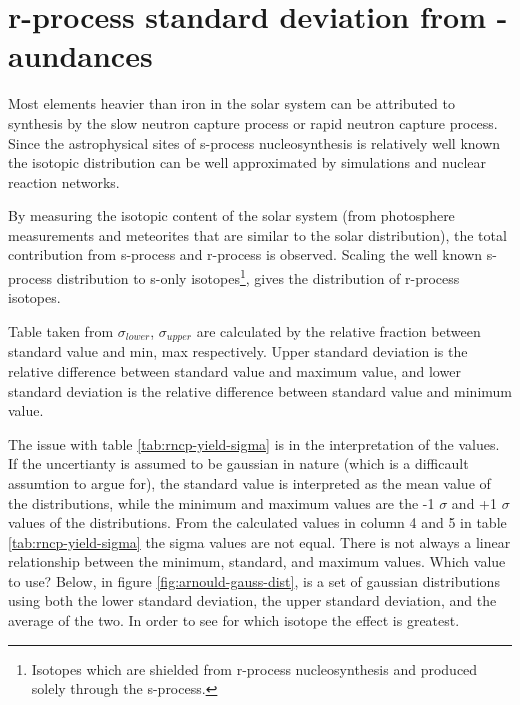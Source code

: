 \section{r-process standard deviation from \sos-aundances}
Most elements heavier than iron in the solar system can be attributed to synthesis by the slow neutron capture process or rapid neutron capture process. Since the astrophysical sites of s-process nucleosynthesis is relatively well known the isotopic distribution can be well approximated by simulations and nuclear reaction networks.

By measuring the isotopic content of the solar system (from photosphere measurements and meteorites that are similar to the solar distribution), the total contribution from s-process and r-process is observed. Scaling the well known s-process distribution to s-only isotopes\footnote{Isotopes which are shielded from r-process nucleosynthesis and produced solely through the s-process.}, gives the distribution of r-process isotopes.

\begin{table}
  
  \caption[Observed r-process abundances in \sos\ ()]{\label{tab:rncp-yield-sigma}
    Table taken from 
    $\sigma_{lower}$, $\sigma_{upper}$ are calculated by the relative fraction between standard value and min, max respectively.
    Upper standard deviation is the relative difference between standard value and maximum value, and lower standard deviation is the relative difference between standard value and minimum value.
  }
\end{table}
\FloatBarrier

The issue with table \ref{tab:rncp-yield-sigma} is in the interpretation of the values. If the uncertianty is assumed to be gaussian in nature (which is a difficault assumtion to argue for), the standard value is interpreted as the mean value of the distributions, while the minimum and maximum values are the -1 $\sigma$ and +1 $\sigma$ values of the distributions. From the calculated values in column 4 and 5 in table \ref{tab:rncp-yield-sigma} the sigma values are not equal. There is not always a linear relationship between the minimum, standard, and maximum values.
Which value to use? Below, in figure \ref{fig:arnould-gauss-dist}, is a set of gaussian distributions using both  the lower standard deviation, the upper standard deviation, and the average of the two.
In order to see for which isotope the effect is greatest.

